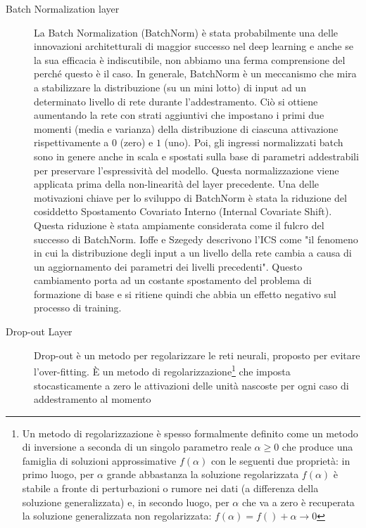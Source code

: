 \begin{description}
\begin{figure}[h!]
        \label{fig:PoolLayer}
    \end{figure}
    \item[Batch Normalization layer] La Batch Normalization (BatchNorm) \cite{ioffe2015batch,9077735} è stata
    probabilmente una delle innovazioni architetturali di maggior successo nel deep learning e anche se la sua 
    efficacia è indiscutibile, non abbiamo una ferma comprensione del perché questo è il caso. In generale, 
    BatchNorm è un meccanismo che mira a stabilizzare la distribuzione (su un mini lotto) di input ad un
    determinato livello di rete durante l'addestramento. Ciò si ottiene aumentando la rete con strati aggiuntivi 
    che impostano i primi due momenti (media e varianza) della distribuzione di ciascuna attivazione rispettivamente 
    a $0$ (zero) e $1$ (uno). Poi, gli ingressi normalizzati batch sono in genere anche in scala e spostati sulla 
    base di parametri addestrabili per preservare l'espressività del modello. Questa normalizzazione viene applicata
    prima della non-linearità del layer precedente. Una delle motivazioni chiave per lo sviluppo di BatchNorm è 
    stata la riduzione del cosiddetto Spostamento Covariato Interno (Internal Covariate Shift).
    Questa riduzione è stata ampiamente considerata come il fulcro del successo di BatchNorm. Ioffe e Szegedy
    \cite{ioffe2015batch} descrivono l'ICS come "il fenomeno in cui la distribuzione degli input a un livello 
    della rete cambia a causa di un aggiornamento dei parametri dei livelli precedenti". Questo cambiamento porta 
    ad un costante spostamento del problema di formazione di base e si ritiene quindi che abbia un
    effetto negativo sul processo di training.
    \item[Drop-out Layer] Drop-out \cite{hinton2012improving} è un metodo per regolarizzare le reti neurali, 
    proposto per evitare l'over-fitting. È un metodo di regolarizzazione\footnote{Un metodo di regolarizzazione 
    è spesso formalmente definito come un metodo di inversione a seconda di un singolo parametro reale $\alpha \geq 0$
    che produce una famiglia di soluzioni approssimative $f(\alpha)$ con le seguenti due proprietà: 
    in primo luogo, per $\alpha$ grande abbastanza la soluzione regolarizzata $f(\alpha)$ è stabile a fronte di
    perturbazioni o rumore nei dati (a differenza della soluzione generalizzata) e, in secondo luogo, per $\alpha$ 
    che va a zero è recuperata la soluzione generalizzata non regolarizzata: $f(\alpha) = f() + \alpha \to 0$} 
    che imposta stocasticamente a zero le attivazioni delle unità nascoste per ogni caso di addestramento al momento

\end{description}
